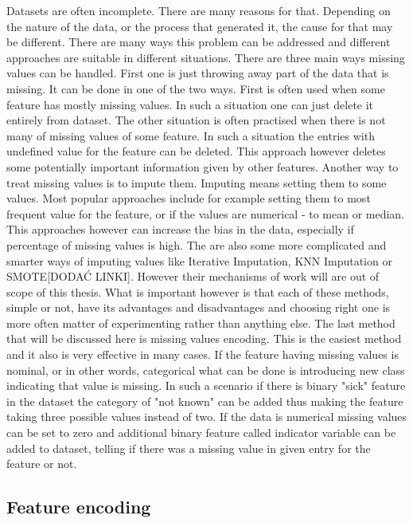 \documentclass[a4paper,twoside,12pt]{book}
\begin{document}
Datasets are often incomplete. There are many reasons for that. Depending on the nature of the data, or the process that generated it, the cause for that may be different. There are many ways this problem can be addressed and different approaches are suitable in different situations.
There are three main ways missing values can be handled. First one is just throwing away part of the data that is missing. It can be done in one of the two ways. First is often used when some feature has mostly missing values. In such a situation one can just delete it entirely from dataset. The other situation is often practised when there is not many of missing values of some feature. In such a situation the entries with undefined value for the feature can be deleted. This approach however deletes some potentially important information given by other features.
Another way to treat missing values is to impute them. Imputing means setting them to some values. Most popular approaches include for example setting them to most frequent value for the feature, or if the values are numerical - to mean or median. This approaches however can increase the bias in the data, especially if percentage of missing values is high. 
The are also some more complicated and smarter ways of imputing values like Iterative Imputation, KNN Imputation or SMOTE[DODAĆ LINKI]. However their mechanisms of work will are out of scope of this thesis.
What is important however is that each of these methods, simple or not, have its advantages and disadvantages and choosing right one is more often matter of experimenting rather than anything else.
The last method that will be discussed here is missing values encoding. This is the easiest method and it also is very effective in many cases. If the feature having missing values is nominal, or in other words, categorical what can be done is introducing new class indicating that value is missing. In such a scenario if there is binary "sick" feature in the dataset the category of "not known" can be added thus making the feature taking three possible values instead of two. If the data is numerical missing values can be set to zero and additional binary feature called indicator variable can be added to dataset, telling if there was a missing value in given entry for the feature or not.

\subsection{Feature encoding}
\end{document}
